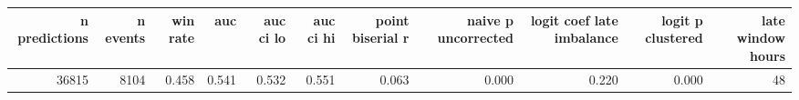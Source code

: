 \begin{tabular}{rrrrrrrrrrr}
\toprule
n predictions & n events & win rate & auc & auc ci lo & auc ci hi & point biserial r & naive p uncorrected & logit coef late imbalance & logit p clustered & late window hours \\
\midrule
36815 & 8104 & 0.458 & 0.541 & 0.532 & 0.551 & 0.063 & 0.000 & 0.220 & 0.000 & 48 \\
\bottomrule
\end{tabular}
